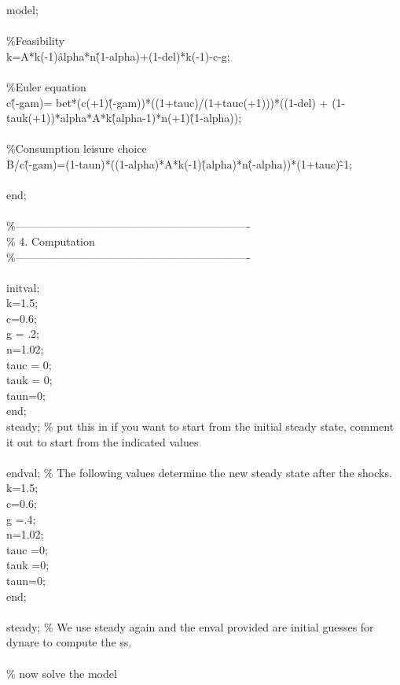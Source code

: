 \documentclass[a4paper,12pt]{scrartcl} %
\begin{document}
model;\\
\\
\%Feasibility\\
k=A*k(-1)\^alpha*n\^(1-alpha)+(1-del)*k(-1)-c-g;\\
\\
\%Euler equation\\
c\^(-gam)= bet*(c(+1)\^(-gam))*((1+tauc)/(1+tauc(+1)))*((1-del) + (1-tauk(+1))*alpha*A*k\^(alpha-1)*n(+1)\^(1-alpha));\\
\\
\%Consumption leisure choice\\
B/c\^(-gam)=(1-taun)*((1-alpha)*A*k(-1)\^(alpha)*n\^(-alpha))*(1+tauc)\^-1;\\
\\
end;\\
\\
\%----------------------------------------------------------------\\
\% 4. Computation\\
\%----------------------------------------------------------------\\
\\
initval;\\
k=1.5;\\
c=0.6;\\
g = .2;\\
n=1.02;\\
tauc = 0;\\
tauk = 0;\\
taun=0;\\
end;\\
steady; \% put this in if you want to start from the initial steady state, comment it out to start from the indicated values\\
\\
endval; \% The following values determine the new steady state after the shocks.\\
k=1.5;\\
c=0.6;\\
g =.4;\\
n=1.02;\\
tauc =0;\\
tauk =0;\\
taun=0;\\
end;\\
\\
steady; \% We use steady again and the enval provided are initial guesses for dynare to compute the ss.\\
\\
\% now solve the model\\
\end{document}
